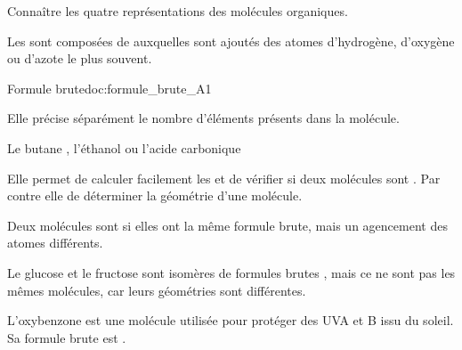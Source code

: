 \tetePremStssOrga

\vspace*{-30pt}


\begin{objectifs}
  \item Connaître les quatre représentations des molécules organiques.
\end{objectifs}

\begin{contexte}
  Les  sont composées de  auxquelles sont ajoutés des atomes d'hydrogène, d'oxygène ou d'azote le plus souvent.
  
\end{contexte}

\vspace*{-12pt}

\vspace*{-8pt}
\begin{doc}{Formule brute}{doc:formule_brute_A1}
  \begin{importants}
    Elle précise séparément le nombre d'éléments présents dans la molécule.
  \end{importants}
  \exemple* Le butane , l'éthanol  ou l'acide carbonique 
  
  Elle permet de calculer facilement les  et de vérifier si deux molécules sont .
  Par contre elle  de déterminer la géométrie d'une molécule.

  \begin{importants}
    Deux molécules sont  si elles ont la même formule brute, mais un agencement des atomes différents.
  \end{importants}
  \exemple* Le glucose et le fructose sont isomères de formules brutes , mais ce ne sont pas les mêmes molécules, car leurs géométries sont différentes.
\end{doc}

L'oxybenzone est une molécule utilisée pour protéger des UVA et B issu du soleil.
Sa formule brute est .


